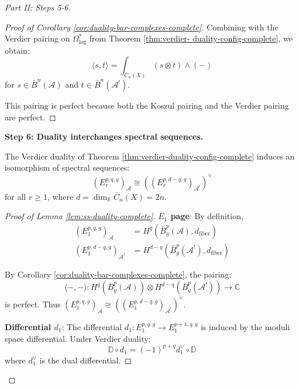 \begin{proof}[Part II: Steps 5-6]
\begin{proof}[Proof of Corollary \ref{cor:duality-bar-complexes-complete}]
Combining with the Verdier pairing on $\Omega^*_{\log}$ from Theorem \ref{thm:verdier-
duality-config-complete}, we obtain:
\begin{equation}
\langle s, t \rangle = \int_{\overline{C}_n(X)} (s \otimes t) \wedge (-)
\end{equation}
for $s \in \bar{B}^n(\mathcal{A})$ and $t \in \bar{B}^n(\mathcal{A}^!)$.

This pairing is perfect because both the Koszul pairing and the Verdier pairing are 
perfect.
\end{proof}

\textbf{Step 6: Duality interchanges spectral sequences.}

\begin{lemma}
\label{lem:ss-duality-complete}
The Verdier duality of Theorem \ref{thm:verdier-duality-config-complete} induces an isomorphism 
of spectral sequences:
\begin{equation}
(E_r^{p,q,g})_{\mathcal{A}} \cong ((E_r^{p,d-q,g})_{\mathcal{A}^!})^\vee
\end{equation}
for all $r \geq 1$, where $d = \dim_{\mathbb{R}} \overline{C}_n(X) = 2n$.
\end{lemma}

\begin{proof}[Proof of Lemma \ref{lem:ss-duality-complete}]
\textbf{$E_1$ page}: By definition,
\begin{align}
(E_1^{p,q,g})_{\mathcal{A}} &= H^q(\bar{B}^p_g(\mathcal{A}), d_{\text{fiber}})\\
(E_1^{p,d-q,g})_{\mathcal{A}^!} &= H^{d-q}(\bar{B}^p_g(\mathcal{A}^!), d_{\text{fiber}})
\end{align}

By Corollary \ref{cor:duality-bar-complexes-complete}, the pairing:
\begin{equation}
\langle -, - \rangle: H^q(\bar{B}^p_g(\mathcal{A})) \otimes H^{d-q}(\bar{B}^p_g(
\mathcal{A}^!)) \to \mathbb{C}
\end{equation}
is perfect. Thus $(E_1^{p,q,g})_{\mathcal{A}} \cong ((E_1^{p,d-q,g})_{\mathcal{A}^!})^\vee$.

\textbf{Differential $d_1$}: The differential $d_1: E_1^{p,q,g} \to E_1^{p+1,q,g}$ is 
induced by the moduli space differential. Under Verdier duality:
\begin{equation}
\mathbb{D} \circ d_1 = (-1)^{p+q} d_1^\vee \circ \mathbb{D}
\end{equation}
where $d_1^\vee$ is the dual differential.


\end{proof}
\end{proof}
